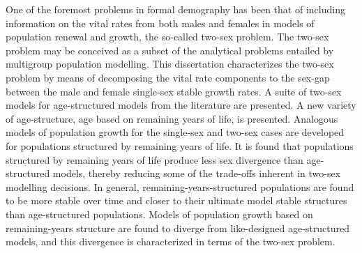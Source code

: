 
One of the foremost problems in formal demography has been that of including
information on the vital rates from both males and females in models of
population renewal and growth, the so-called two-sex problem. The two-sex
problem may be conceived as a subset of the analytical problems entailed by
multigroup population modelling. This dissertation characterizes the two-sex 
problem by means of decomposing the vital 
rate components to the sex-gap between the male and female single-sex stable growth
rates. A suite of two-sex models for age-structured models from the
literature are presented. A new variety of age-structure, age based on remaining
years of life, is presented. Analogous models of population growth for the
single-sex and two-sex cases are developed for populations structured by
remaining years of life. It is found that populations structured by remaining
years of life produce less sex divergence than age-structured models,
thereby reducing some of the trade-offs inherent in two-sex modelling decisions.
In general, remaining-years-structured populations are found to be more stable
over time and closer to their ultimate model stable structures than
age-structured populations. Models of population growth based on remaining-years 
structure are found to diverge from
like-designed age-structured models, and this divergence is characterized in
terms of the two-sex problem.
